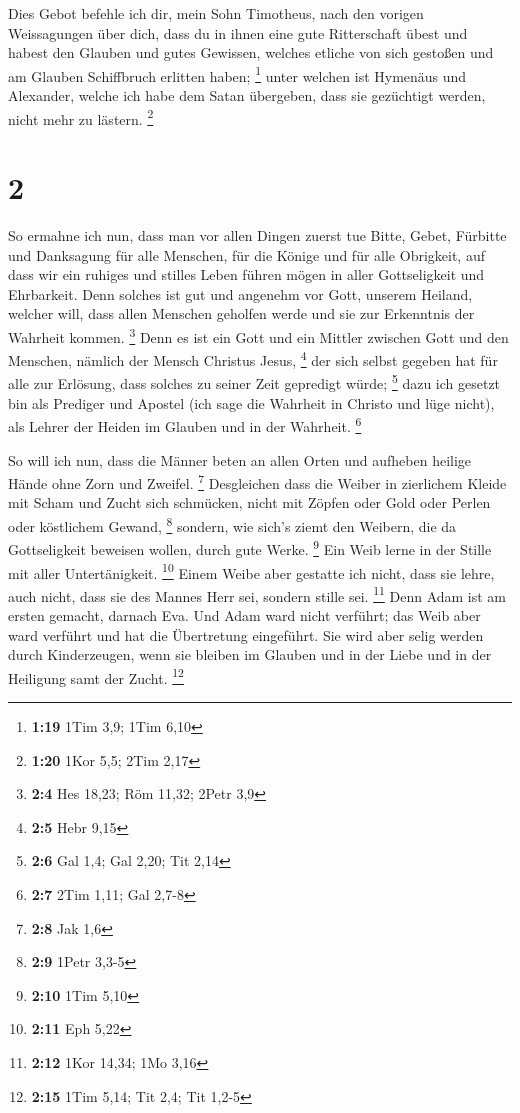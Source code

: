  Dies Gebot befehle ich dir, mein Sohn Timotheus, nach den
vorigen Weissagungen über dich, dass du in ihnen eine gute Ritterschaft
übest  und habest den Glauben und gutes Gewissen, welches
etliche von sich gestoßen und am Glauben Schiffbruch erlitten haben;
\footnote{\textbf{1:19} 1Tim 3,9; 1Tim 6,10}  unter welchen
ist Hymenäus und Alexander, welche ich habe dem Satan übergeben, dass
sie gezüchtigt werden, nicht mehr zu lästern. \footnote{\textbf{1:20}
  1Kor 5,5; 2Tim 2,17}

\hypertarget{section-1}{%
\section{2}\label{section-1}}

 So ermahne ich nun, dass man vor allen Dingen zuerst tue
Bitte, Gebet, Fürbitte und Danksagung für alle Menschen, 
für die Könige und für alle Obrigkeit, auf dass wir ein ruhiges und
stilles Leben führen mögen in aller Gottseligkeit und Ehrbarkeit.
 Denn solches ist gut und angenehm vor Gott, unserem
Heiland,  welcher will, dass allen Menschen geholfen werde
und sie zur Erkenntnis der Wahrheit kommen. \footnote{\textbf{2:4} Hes
  18,23; Röm 11,32; 2Petr 3,9}  Denn es ist ein Gott und ein
Mittler zwischen Gott und den Menschen, nämlich der Mensch Christus
Jesus, \footnote{\textbf{2:5} Hebr 9,15}  der sich selbst
gegeben hat für alle zur Erlösung, dass solches zu seiner Zeit gepredigt
würde; \footnote{\textbf{2:6} Gal 1,4; Gal 2,20; Tit 2,14} 
dazu ich gesetzt bin als Prediger und Apostel (ich sage die Wahrheit in
Christo und lüge nicht), als Lehrer der Heiden im Glauben und in der
Wahrheit. \footnote{\textbf{2:7} 2Tim 1,11; Gal 2,7-8}

 So will ich nun, dass die Männer beten an allen Orten und
aufheben heilige Hände ohne Zorn und Zweifel. \footnote{\textbf{2:8} Jak
  1,6}  Desgleichen dass die Weiber in zierlichem Kleide mit
Scham und Zucht sich schmücken, nicht mit Zöpfen oder Gold oder Perlen
oder köstlichem Gewand, \footnote{\textbf{2:9} 1Petr 3,3-5}
 sondern, wie sich's ziemt den Weibern, die da
Gottseligkeit beweisen wollen, durch gute Werke. \footnote{\textbf{2:10}
  1Tim 5,10}  Ein Weib lerne in der Stille mit aller
Untertänigkeit. \footnote{\textbf{2:11} Eph 5,22}  Einem
Weibe aber gestatte ich nicht, dass sie lehre, auch nicht, dass sie des
Mannes Herr sei, sondern stille sei. \footnote{\textbf{2:12} 1Kor 14,34;
  1Mo 3,16}  Denn Adam ist am ersten gemacht, darnach Eva.
 Und Adam ward nicht verführt; das Weib aber ward verführt
und hat die Übertretung eingeführt.  Sie wird aber selig
werden durch Kinderzeugen, wenn sie bleiben im Glauben und in der Liebe
und in der Heiligung samt der Zucht. \footnote{\textbf{2:15} 1Tim 5,14;
  Tit 2,4; Tit 1,2-5}


